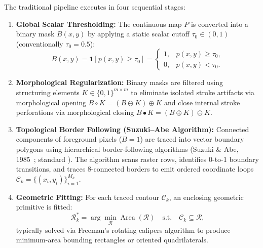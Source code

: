 \documentclass[11pt,a4paper]{article}
\newcommand{\code}[1]{\texttt{\detokenize{#1}}}
\newcommand{\1}{\mathbf{1}}
\begin{document}
The traditional pipeline executes in four sequential stages:
\begin{enumerate}
    \item \textbf{Global Scalar Thresholding:} The continuous map $P$ is converted into a binary mask $B(x,y)$ by applying a static scalar cutoff $\tau_0 \in (0,1)$ (conventionally $\tau_0 = 0.5$):
    \begin{equation}
    B(x,y) = \1\!\left[ p(x,y) \ge \tau_0 \right] =
    \begin{cases}
    1, & p(x,y) \ge \tau_0, \\
    0, & p(x,y) < \tau_0.
    \end{cases}
    \label{eq:static-bin}
    \end{equation}
    \item \textbf{Morphological Regularization:} Binary masks are filtered using structuring elements $K \in \{0, 1\}^{m \times m}$ to eliminate isolated stroke artifacts via morphological opening $B \circ K = (B \ominus K) \oplus K$ and close internal stroke perforations via morphological closing $B \bullet K = (B \oplus K) \ominus K$.
    \item \textbf{Topological Border Following (Suzuki--Abe Algorithm):} Connected components of foreground pixels ($B=1$) are traced into vector boundary polygons using hierarchical border-following algorithms (Suzuki \& Abe, 1985~\cite{suzuki}; standard \code{cv2.findContours}). The algorithm scans raster rows, identifies 0-to-1 boundary transitions, and traces 8-connected borders to emit ordered coordinate loops $\mathcal{C}_k = \{(x_i, y_i)\}_{i=1}^{M_k}$.
    \item \textbf{Geometric Fitting:} For each traced contour $\mathcal{C}_k$, an enclosing geometric primitive is fitted:
    \[
    \mathcal{R}_k^* = \arg\min_{\mathcal{R}} \operatorname{Area}(\mathcal{R}) \quad \text{s.t.} \quad \mathcal{C}_k \subseteq \mathcal{R},
    \]
    typically solved via Freeman's rotating calipers algorithm to produce minimum-area bounding rectangles or oriented quadrilaterals.
\end{enumerate}
\end{document}
